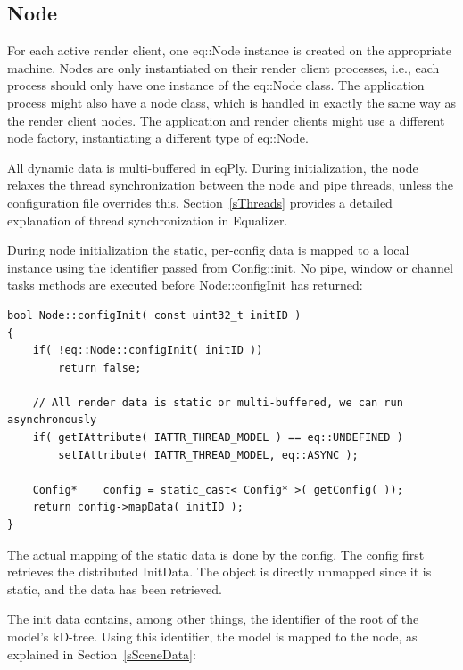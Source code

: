 \documentclass[10pt,a4]{scrartcl}
\newcommand{\sref}[1]{Section~\ref{#1}}
\begin{document}
\subsection{Node}

For each active render client, one \textsf{eq::Node} instance is
created on the appropriate machine. Nodes are only instantiated on their
render client processes, i.e., each process should only have one
instance of the \textsf{eq::Node} class. The application process might
also have a node class, which is handled in exactly the same way as the
render client nodes. The application and render clients might use a
different node factory, instantiating a different type of \textsf{eq::Node}.

All dynamic data is multi-buffered in \textsf{eqPly}. During
initialization, the node relaxes the thread synchronization between the
node and pipe threads, unless the configuration file overrides
this. \sref{sThreads} provides a detailed explanation of thread
synchronization in Equalizer.

During node initialization the static, per-config data is mapped to a
local instance using the identifier passed from
\textsf{Config::init}. No pipe, window or channel tasks methods are
executed before \textsf{Node::configInit} has returned:

{\footnotesize\begin{lstlisting}
bool Node::configInit( const uint32_t initID )
{
    if( !eq::Node::configInit( initID ))
        return false;

    // All render data is static or multi-buffered, we can run asynchronously
    if( getIAttribute( IATTR_THREAD_MODEL ) == eq::UNDEFINED )
        setIAttribute( IATTR_THREAD_MODEL, eq::ASYNC );

    Config*    config = static_cast< Config* >( getConfig( ));
    return config->mapData( initID );
}
\end{lstlisting}}

The actual mapping of the static data is done by the config. The config
first retrieves the distributed \textsf{InitData}. The object is
directly unmapped since it is static, and the data has been retrieved.

The init data contains, among other things, the identifier of the
root of the model's kD-tree. Using this identifier, the model is mapped
to the node, as explained in \sref{sSceneData}:
\end{document}
